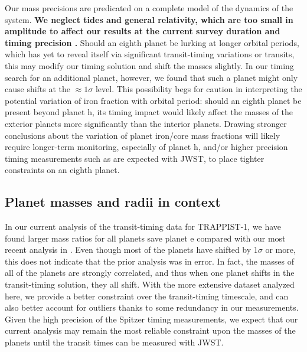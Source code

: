 \documentclass[twocolumn]{aastex63}
\begin{document}
Our mass precisions are predicated on a complete model of the dynamics of the system.  \textbf{We neglect tides and general relativity, which are too small in amplitude to affect our results at the current survey duration and timing precision \citep{Bolmont2020}.} Should an eighth planet be lurking at longer orbital periods, which has yet to reveal itself via significant transit-timing variations or transits, this may modify our timing solution and shift the masses slightly.  In our timing search for an additional planet, however, we found that such a planet might only cause shifts at the ${\approx} 1\sigma$ level.  This possibility begs for caution in interpreting the potential variation of iron fraction with orbital period:  should an eighth planet be present beyond planet h, its timing impact would likely affect the masses of the exterior planets more significantly than the interior planets.  Drawing stronger conclusions about the variation of planet iron/core mass fractions will likely require longer-term monitoring, especially of planet h, and/or higher precision timing measurements such as are expected with JWST, to place tighter constraints on an eighth planet.

\subsection{Planet masses and radii in context}

In our current analysis of the transit-timing data
for TRAPPIST-1, we have found larger mass ratios for
all planets save planet e compared with our most
recent analysis in \citet{Grimm2018}.  Even though
most of the planets have shifted by 1$\sigma$ or more,
this does not indicate that the prior analysis was in
error.  In fact, the masses of all of the planets
are strongly correlated, and thus when one planet shifts
in the transit-timing solution, they all shift.  With
the more extensive dataset analyzed here, we provide
a better constraint over the transit-timing timescale,
and can also better account for outliers thanks to some
redundancy in our measurements. Given the high precision of
the Spitzer timing measurements, we expect that our current
analysis may remain the most reliable constraint upon the
masses of the planets until the transit times can be measured
with JWST.


\end{document}
